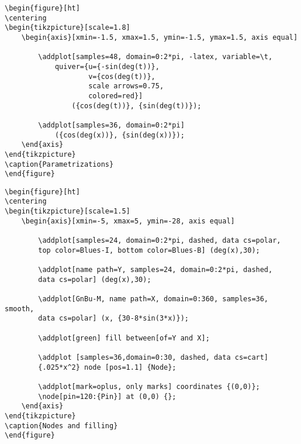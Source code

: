 \newpage
\begin{verbatim}
\begin{figure}[ht]
\centering
\begin{tikzpicture}[scale=1.8]
    \begin{axis}[xmin=-1.5, xmax=1.5, ymin=-1.5, ymax=1.5, axis equal]
    
        \addplot[samples=48, domain=0:2*pi, -latex, variable=\t,
            quiver={u={-sin(deg(t))},
                    v={cos(deg(t))},
                    scale arrows=0.75,
                    colored=red}]
                ({cos(deg(t))}, {sin(deg(t))});
       
        \addplot[samples=36, domain=0:2*pi]
            ({cos(deg(x))}, {sin(deg(x))});
    \end{axis}
\end{tikzpicture}
\caption{Parametrizations}
\end{figure}
\end{verbatim}


\newpage
\begin{verbatim}
\begin{figure}[ht]
\centering
\begin{tikzpicture}[scale=1.5]
    \begin{axis}[xmin=-5, xmax=5, ymin=-28, axis equal]
        
        \addplot[samples=24, domain=0:2*pi, dashed, data cs=polar,
        top color=Blues-I, bottom color=Blues-B] (deg(x),30);
        
        \addplot[name path=Y, samples=24, domain=0:2*pi, dashed, 
        data cs=polar] (deg(x),30);
        
        \addplot[GnBu-M, name path=X, domain=0:360, samples=36, smooth,
        data cs=polar] (x, {30-8*sin(3*x)});
        
        \addplot[green] fill between[of=Y and X];
        
        \addplot [samples=36,domain=0:30, dashed, data cs=cart]
        {.025*x^2} node [pos=1.1] {Node};
        
        \addplot[mark=oplus, only marks] coordinates {(0,0)};
        \node[pin=120:{Pin}] at (0,0) {};
    \end{axis}
\end{tikzpicture}
\caption{Nodes and filling}
\end{figure}
\end{verbatim}


